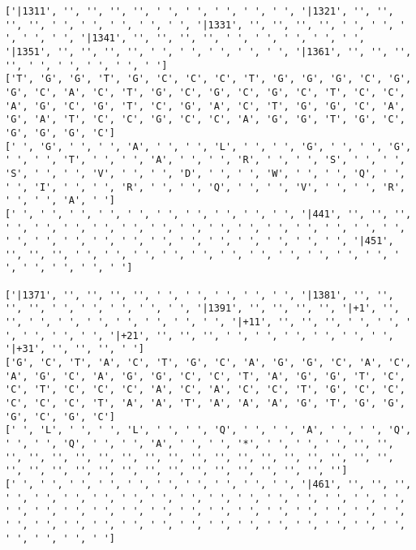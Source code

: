 \documentclass{article}
\begin{document}
\begin{Verbatim}
['|1311', '', '', '', '', ' ', ' ', ' ', ' ', ' ', '|1321', '', '', '', '', ' ', ' ', ' ', ' ', ' ', '|1331', '', '', '', '', ' ', ' ', ' ', ' ', ' ', '|1341', '', '', '', '', ' ', ' ', ' ', ' ', ' ', '|1351', '', '', '', '', ' ', ' ', ' ', ' ', ' ', '|1361', '', '', '', '', ' ', ' ', ' ', ' ', ' ']
['T', 'G', 'G', 'T', 'G', 'C', 'C', 'C', 'T', 'G', 'G', 'G', 'C', 'G', 'G', 'C', 'A', 'C', 'T', 'G', 'C', 'G', 'C', 'G', 'C', 'T', 'C', 'C', 'A', 'G', 'C', 'G', 'T', 'C', 'G', 'A', 'C', 'T', 'G', 'G', 'C', 'A', 'G', 'A', 'T', 'C', 'C', 'G', 'C', 'C', 'A', 'G', 'G', 'T', 'G', 'C', 'G', 'G', 'G', 'C']
[' ', 'G', ' ', ' ', 'A', ' ', ' ', 'L', ' ', ' ', 'G', ' ', ' ', 'G', ' ', ' ', 'T', ' ', ' ', 'A', ' ', ' ', 'R', ' ', ' ', 'S', ' ', ' ', 'S', ' ', ' ', 'V', ' ', ' ', 'D', ' ', ' ', 'W', ' ', ' ', 'Q', ' ', ' ', 'I', ' ', ' ', 'R', ' ', ' ', 'Q', ' ', ' ', 'V', ' ', ' ', 'R', ' ', ' ', 'A', ' ']
[' ', ' ', ' ', ' ', ' ', ' ', ' ', ' ', ' ', ' ', '|441', '', '', '', ' ', ' ', ' ', ' ', ' ', ' ', ' ', ' ', ' ', ' ', ' ', ' ', ' ', ' ', ' ', ' ', ' ', ' ', ' ', ' ', ' ', ' ', ' ', ' ', ' ', ' ', '|451', '', '', '', ' ', ' ', ' ', ' ', ' ', ' ', ' ', ' ', ' ', ' ', ' ', ' ', ' ', ' ', ' ', ' ']
  
['|1371', '', '', '', '', ' ', ' ', ' ', ' ', ' ', '|1381', '', '', '', '', ' ', ' ', ' ', ' ', ' ', '|1391', '', '', '', '', '|+1', '', '', ' ', ' ', ' ', ' ', ' ', ' ', ' ', '|+11', '', '', '', ' ', ' ', ' ', ' ', ' ', ' ', '|+21', '', '', '', ' ', ' ', ' ', ' ', ' ', ' ', '|+31', '', '', '', ' ']
['G', 'C', 'T', 'A', 'C', 'T', 'G', 'C', 'A', 'G', 'G', 'C', 'A', 'C', 'A', 'G', 'C', 'A', 'G', 'G', 'C', 'C', 'T', 'A', 'G', 'G', 'T', 'C', 'C', 'T', 'C', 'C', 'C', 'A', 'C', 'A', 'C', 'C', 'T', 'G', 'C', 'C', 'C', 'C', 'C', 'T', 'A', 'A', 'T', 'A', 'A', 'A', 'G', 'T', 'G', 'G', 'G', 'C', 'G', 'C']
[' ', 'L', ' ', ' ', 'L', ' ', ' ', 'Q', ' ', ' ', 'A', ' ', ' ', 'Q', ' ', ' ', 'Q', ' ', ' ', 'A', ' ', ' ', '*', ' ', ' ', ' ', '', '', '', '', '', '', '', '', '', '', '', '', '', '', '', '', '', '', '', '', '', '', '', '', '', '', '', '', '', '', '', '', '', '']
[' ', ' ', ' ', ' ', ' ', ' ', ' ', ' ', ' ', ' ', '|461', '', '', '', ' ', ' ', ' ', ' ', ' ', ' ', ' ', ' ', ' ', ' ', ' ', ' ', ' ', ' ', ' ', ' ', ' ', ' ', ' ', ' ', ' ', ' ', ' ', ' ', ' ', ' ', ' ', ' ', ' ', ' ', ' ', ' ', ' ', ' ', ' ', ' ', ' ', ' ', ' ', ' ', ' ', ' ', ' ', ' ', ' ', ' ']
  

\end{Verbatim}
\end{document}
